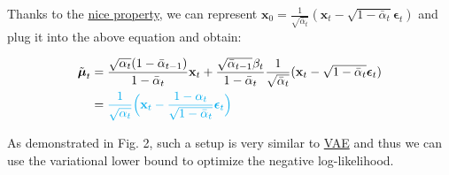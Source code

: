 \documentclass[12pt]{article}
\begin{document}
Thanks to the \href{https://lilianweng.github.io/posts/2018-08-12-vae/#reparameterization-trick}{nice property}, we can represent $\mathbf{x}_0 = \frac{1}{\sqrt{\bar{\alpha}_t}}(\mathbf{x}_t - \sqrt{1 - \bar{\alpha}_t}\boldsymbol{\epsilon}_t)$ and plug it into the above equation and obtain:

\[
\begin{aligned}
\tilde{\boldsymbol{\mu}}_t
&= \frac{\sqrt{\alpha_t}(1 - \bar{\alpha}_{t-1})}{1 - \bar{\alpha}_t} \mathbf{x}_t + \frac{\sqrt{\bar{\alpha}_{t-1}}\beta_t}{1 - \bar{\alpha}_t} \frac{1}{\sqrt{\bar{\alpha}_t}}(\mathbf{x}_t - \sqrt{1 - \bar{\alpha}_t}\boldsymbol{\epsilon}_t) \\
&= \color{cyan}{\frac{1}{\sqrt{\alpha_t}} \Big( \mathbf{x}_t - \frac{1 - \alpha_t}{\sqrt{1 - \bar{\alpha}_t}} \boldsymbol{\epsilon}_t \Big)}
\end{aligned}
\]

As demonstrated in Fig. 2, such a setup is very similar to \href{https://lilianweng.github.io/posts/2018-08-12-vae/}{VAE} and thus we can use the variational lower bound to optimize the negative log-likelihood.
\end{document}
